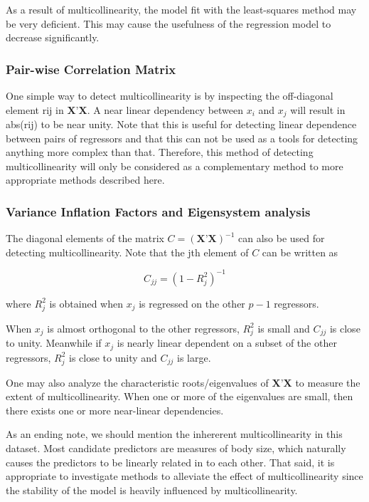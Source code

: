\documentclass[11pt]{article}
\begin{document}
As a result of multicollinearity, the model fit with the least-squares method may be very deficient.
This may cause the usefulness of the regression model to decrease significantly. 

\subsubsection{Pair-wise Correlation Matrix}
\label{sec:org5684d73}

One simple way to detect multicollinearity is by inspecting the off-diagonal element rij in \(\textbf{X}’\textbf{X}\).
A near linear dependency between \(x_i\) and \(x_j\) will result in abs(rij) to be near unity. Note that this is
useful for detecting linear dependence between pairs of regressors and that this can not be used as a tools for
detecting anything more complex than that. Therefore, this method of detecting multicollinearity will
only be considered as a complementary method to more appropriate methods described here.

\subsubsection{Variance Inflation Factors and Eigensystem analysis}
\label{sec:org5c21d00}

The diagonal elements of the matrix \(C = (\textbf{X}’\textbf{X})^{-1}\) can also be used for detecting multicollinearity. Note that 
the jth element of \(C\) can be written as

\[
   C_{jj}=(1-R_j^2)^{-1}
   \]

where \(R_j^2\) is obtained when \(x_j\) is regressed on the other \(p-1\) regressors.

When \(x_j\) is almost orthogonal to the other regressors, \(R_j^2\) is small and \(C_{jj}\) is close to unity. Meanwhile 
if \(x_j\) is nearly linear dependent on a subset of the other regressors, \(R^2_j\) is close to unity and \(C_{jj}\)
is large.

One may also analyze the characteristic roots/eigenvalues of \(\textbf{X}’\textbf{X}\) to measure the extent of
multicollinearity. When one or more of the eigenvalues are small, then there exists one or more near-linear
dependencies. 

As an ending note, we should mention the inhererent multicollinearity in this dataset. Most candidate predictors 
are measures of body size, which naturally causes the predictors to be linearly related in to each other. That 
said, it is appropriate to investigate methods to alleviate the effect of multicollinearity since 
the stability of the model is heavily influenced by multicollinearity.
\end{document}
